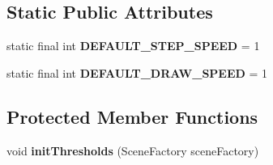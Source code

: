 \subsection*{Static Public Attributes}
\begin{DoxyCompactItemize}
\item 
\hypertarget{classdev_1_1boxy_1_1fortyfive_1_1core_1_1line_1_1_line_factory_aac8c7961b4189fd9b53d72a78a096106}{
static final int {\bfseries DEFAULT\_\-STEP\_\-SPEED} = 1}
\label{d0/db4/classdev_1_1boxy_1_1fortyfive_1_1core_1_1line_1_1_line_factory_aac8c7961b4189fd9b53d72a78a096106}

\item 
\hypertarget{classdev_1_1boxy_1_1fortyfive_1_1core_1_1line_1_1_line_factory_a43ca1ca53697b57b7dec4698ec42b8ec}{
static final int {\bfseries DEFAULT\_\-DRAW\_\-SPEED} = 1}
\label{d0/db4/classdev_1_1boxy_1_1fortyfive_1_1core_1_1line_1_1_line_factory_a43ca1ca53697b57b7dec4698ec42b8ec}

\end{DoxyCompactItemize}
\subsection*{Protected Member Functions}
\begin{DoxyCompactItemize}
\item 
\hypertarget{classdev_1_1boxy_1_1fortyfive_1_1core_1_1line_1_1_line_factory_a154fe8fd0be3c7096e9e19a5debe8a2f}{
void {\bfseries initThresholds} (SceneFactory sceneFactory)}
\label{d0/db4/classdev_1_1boxy_1_1fortyfive_1_1core_1_1line_1_1_line_factory_a154fe8fd0be3c7096e9e19a5debe8a2f}

\end{DoxyCompactItemize}
